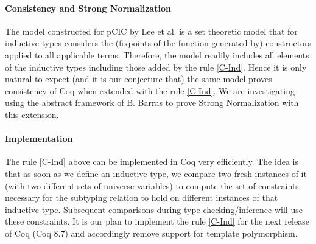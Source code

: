 \documentclass{easychair}
\begin{document}
\paragraph{Consistency and Strong Normalization}
The model constructed for pCIC by Lee et
al. \cite{DBLP:journals/corr/abs-1111-0123} is a set theoretic model
that for inductive types considers the (fixpoints of the function
generated by) constructors applied to all applicable terms. Therefore,
the model readily includes all elements of the inductive types including
those added by the rule \ref{C-Ind}. Hence it is only natural to expect
(and it is our conjecture that) the same model proves consistency of Coq
when extended with the rule \ref{C-Ind}.  We are investigating using the
abstract framework of B. Barras \cite{barass-habil} to prove Strong
Normalization with this extension.

\paragraph{Implementation}
The rule \ref{C-Ind} above can be implemented in Coq very efficiently.
The idea is that as soon as we define an inductive type, we compare
two fresh instances of it (with two different sets of universe
variables) to compute the set of constraints necessary for the subtyping
relation to hold on different instances of that inductive type. Subsequent
comparisons during type checking/inference will use these constraints.
It is our plan to implement the rule \ref{C-Ind} for the next release
of Coq (Coq 8.7) and accordingly remove support for template
polymorphism.

\setlength{\bibsep}{1pt} %
\renewcommand{\bibfont}{\small} %


\end{document}
